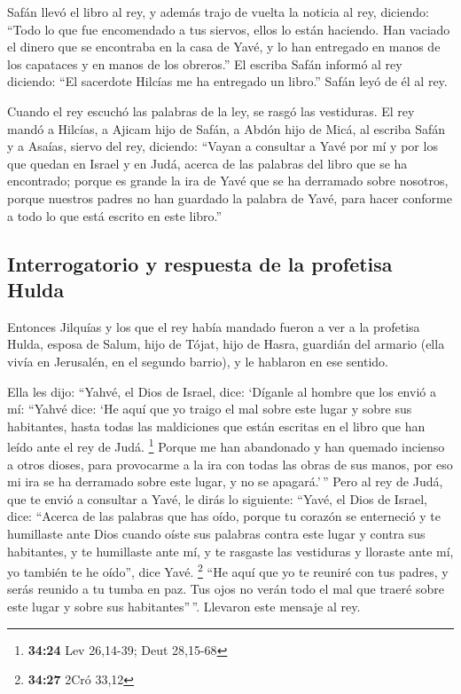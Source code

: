 \begin{paracol}{2}
 Safán llevó el libro al rey, y además trajo de vuelta la
noticia al rey, diciendo: ``Todo lo que fue encomendado a tus siervos,
ellos lo están haciendo.  Han vaciado el dinero que se
encontraba en la casa de Yavé, y lo han entregado en manos de los
capataces y en manos de los obreros.''  El escriba Safán
informó al rey diciendo: ``El sacerdote Hilcías me ha entregado un
libro.'' Safán leyó de él al rey.

 Cuando el rey escuchó las palabras de la ley, se rasgó
las vestiduras.  El rey mandó a Hilcías, a Ajicam hijo de
Safán, a Abdón hijo de Micá, al escriba Safán y a Asaías, siervo del
rey, diciendo:  ``Vayan a consultar a Yavé por mí y por
los que quedan en Israel y en Judá, acerca de las palabras del libro que
se ha encontrado; porque es grande la ira de Yavé que se ha derramado
sobre nosotros, porque nuestros padres no han guardado la palabra de
Yavé, para hacer conforme a todo lo que está escrito en este libro.''

\hypertarget{interrogatorio-y-respuesta-de-la-profetisa-hulda}{%
\subsection{Interrogatorio y respuesta de la profetisa
Hulda}\label{interrogatorio-y-respuesta-de-la-profetisa-hulda}}

 Entonces Jilquías y los que el rey había mandado fueron
a ver a la profetisa Hulda, esposa de Salum, hijo de Tójat, hijo de
Hasra, guardián del armario (ella vivía en Jerusalén, en el segundo
barrio), y le hablaron en ese sentido.

 Ella les dijo: ``Yahvé, el Dios de Israel, dice:
`Díganle al hombre que los envió a mí:  ``Yahvé dice: `He
aquí que yo traigo el mal sobre este lugar y sobre sus habitantes, hasta
todas las maldiciones que están escritas en el libro que han leído ante
el rey de Judá. \footnote{\textbf{34:24} Lev 26,14-39; Deut 28,15-68}
 Porque me han abandonado y han quemado incienso a otros
dioses, para provocarme a la ira con todas las obras de sus manos, por
eso mi ira se ha derramado sobre este lugar, y no se apagará.'\,''
 Pero al rey de Judá, que te envió a consultar a Yavé, le
dirás lo siguiente: ``Yavé, el Dios de Israel, dice: ``Acerca de las
palabras que has oído,  porque tu corazón se enterneció y
te humillaste ante Dios cuando oíste sus palabras contra este lugar y
contra sus habitantes, y te humillaste ante mí, y te rasgaste las
vestiduras y lloraste ante mí, yo también te he oído'', dice Yavé.
\footnote{\textbf{34:27} 2Cró 33,12}  ``He aquí que yo te
reuniré con tus padres, y serás reunido a tu tumba en paz. Tus ojos no
verán todo el mal que traeré sobre este lugar y sobre sus
habitantes''\,''. Llevaron este mensaje al rey.


\end{paracol}
